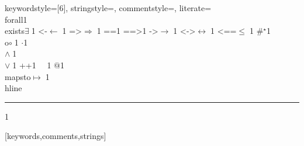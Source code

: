{  keywordstyle=[6]\color{cRed},
  stringstyle=\ttfamily,
  commentstyle={\ttfamily\color{cGreen}},
  literate=
    {\\forall}{{\color{dkgreen}{$\forall\;$}}}1
    {\\exists}{{$\exists\;$}}1
    {<-}{{$\leftarrow\;$}}1
    {=>}{{$\Rightarrow\;$}}1
    {==}{{\code{==}\;}}1
    {==>}{{\code{==>}\;}}1
    {->}{{$\rightarrow\;$}}1
    {<->}{{$\leftrightarrow\;$}}1
    {<==}{{$\leq\;$}}1
    {\#}{{$^\star$}}1 
    {\\o}{{$\circ\;$}}1 
    {\@}{{$\cdot$}}1 
    {\/\\}{{$\wedge\;$}}1
    {\\\/}{{$\vee\;$}}1
    {++}{{\code{++}}}1
    {~}{{\ }}1
    {\@\@}{{$@$}}1
    {\\mapsto}{{$\mapsto\;$}}1
    {\\hline}{{\rule{\linewidth}{0.5pt}}}1
  }[keywords,comments,strings]
